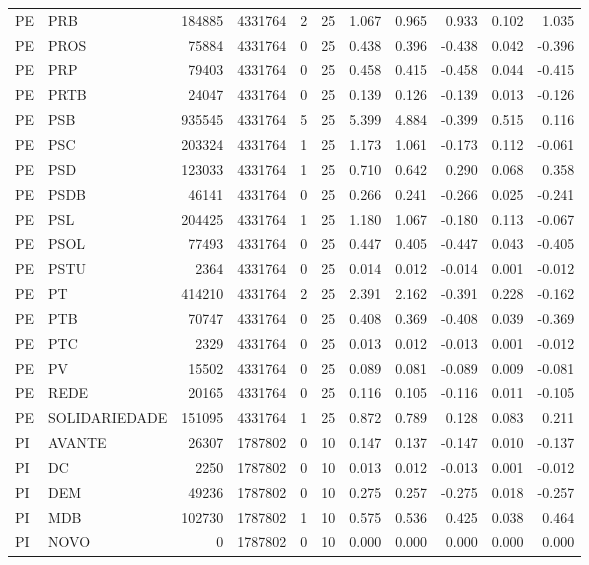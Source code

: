 \begin{landscape}
\begin{longtable}{llrrrrrrrrr}
PE & PRB & 184885 & 4331764 & 2 & 25 & 1.067 & 0.965 & 0.933 & 0.102 & 1.035 \\
PE & PROS & 75884 & 4331764 & 0 & 25 & 0.438 & 0.396 & -0.438 & 0.042 & -0.396 \\
PE & PRP & 79403 & 4331764 & 0 & 25 & 0.458 & 0.415 & -0.458 & 0.044 & -0.415 \\
PE & PRTB & 24047 & 4331764 & 0 & 25 & 0.139 & 0.126 & -0.139 & 0.013 & -0.126 \\
PE & PSB & 935545 & 4331764 & 5 & 25 & 5.399 & 4.884 & -0.399 & 0.515 & 0.116 \\
PE & PSC & 203324 & 4331764 & 1 & 25 & 1.173 & 1.061 & -0.173 & 0.112 & -0.061 \\
PE & PSD & 123033 & 4331764 & 1 & 25 & 0.710 & 0.642 & 0.290 & 0.068 & 0.358 \\
PE & PSDB & 46141 & 4331764 & 0 & 25 & 0.266 & 0.241 & -0.266 & 0.025 & -0.241 \\
PE & PSL & 204425 & 4331764 & 1 & 25 & 1.180 & 1.067 & -0.180 & 0.113 & -0.067 \\
PE & PSOL & 77493 & 4331764 & 0 & 25 & 0.447 & 0.405 & -0.447 & 0.043 & -0.405 \\
PE & PSTU & 2364 & 4331764 & 0 & 25 & 0.014 & 0.012 & -0.014 & 0.001 & -0.012 \\
PE & PT & 414210 & 4331764 & 2 & 25 & 2.391 & 2.162 & -0.391 & 0.228 & -0.162 \\
PE & PTB & 70747 & 4331764 & 0 & 25 & 0.408 & 0.369 & -0.408 & 0.039 & -0.369 \\
PE & PTC & 2329 & 4331764 & 0 & 25 & 0.013 & 0.012 & -0.013 & 0.001 & -0.012 \\
PE & PV & 15502 & 4331764 & 0 & 25 & 0.089 & 0.081 & -0.089 & 0.009 & -0.081 \\
PE & REDE & 20165 & 4331764 & 0 & 25 & 0.116 & 0.105 & -0.116 & 0.011 & -0.105 \\
PE & SOLIDARIEDADE & 151095 & 4331764 & 1 & 25 & 0.872 & 0.789 & 0.128 & 0.083 & 0.211 \\
PI & AVANTE & 26307 & 1787802 & 0 & 10 & 0.147 & 0.137 & -0.147 & 0.010 & -0.137 \\
PI & DC & 2250 & 1787802 & 0 & 10 & 0.013 & 0.012 & -0.013 & 0.001 & -0.012 \\
PI & DEM & 49236 & 1787802 & 0 & 10 & 0.275 & 0.257 & -0.275 & 0.018 & -0.257 \\
PI & MDB & 102730 & 1787802 & 1 & 10 & 0.575 & 0.536 & 0.425 & 0.038 & 0.464 \\
PI & NOVO & 0 & 1787802 & 0 & 10 & 0.000 & 0.000 & 0.000 & 0.000 & 0.000 \\

\end{longtable}
\end{landscape}
